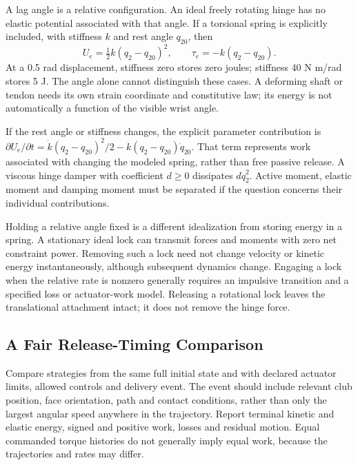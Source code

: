 A lag angle is a relative configuration. An ideal freely rotating hinge has no
elastic potential associated with that angle. If a torsional spring is explicitly
included, with stiffness $k$ and rest angle $q_{20}$, then
\begin{equation}
U_e=\tfrac12 k(q_2-q_{20})^2,
\qquad \tau_e=-k(q_2-q_{20}).
\label{eq:lag_spring_energy}
\end{equation}
At a 0.5 rad displacement, stiffness zero stores zero joules; stiffness
40 N m/rad stores 5 J. The angle alone cannot distinguish these cases. A
deforming shaft or tendon needs its own strain coordinate and constitutive law;
its energy is not automatically a function of the visible wrist angle.

If the rest angle or stiffness changes, the explicit parameter contribution is
$\partial U_e/\partial t=\dot k(q_2-q_{20})^2/2-k(q_2-q_{20})\dot q_{20}$.
That term represents work associated with changing the modeled spring, rather
than free passive release. A viscous hinge damper with coefficient $d\geq0$
dissipates $d\dot q_2^2$. Active moment, elastic moment and damping moment must
be separated if the question concerns their individual contributions.

Holding a relative angle fixed is a different idealization from storing energy
in a spring. A stationary ideal lock can transmit forces and moments with zero
net constraint power. Removing such a lock need not change velocity or kinetic
energy instantaneously, although subsequent dynamics change. Engaging a lock
when the relative rate is nonzero generally requires an impulsive transition
and a specified loss or actuator-work model. Releasing a rotational lock leaves
the translational attachment intact; it does not remove the hinge force.

\subsection{A Fair Release-Timing Comparison}

Compare strategies from the same full initial state and with declared actuator
limits, allowed controls and delivery event. The event should include relevant
club position, face orientation, path and contact conditions, rather than only
the largest angular speed anywhere in the trajectory. Report terminal kinetic
and elastic energy, signed and positive work, losses and residual motion.
Equal commanded torque histories do not generally imply equal work, because
the trajectories and rates may differ.

